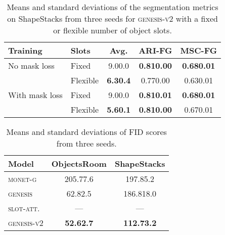 \documentclass{article}
\begin{document}
\begin{table}
	\centering
	\caption{Means and standard deviations of the segmentation metrics on ShapeStacks from three seeds for \textsc{genesis-v2} with a fixed or flexible number of object slots.}
	\begin{tabular}{llccc}
		\toprule
		Training & Slots & Avg.  & ARI-FG & MSC-FG \\
		\midrule
		No mask loss & Fixed    & 9.00.0 & \textbf{0.810.00} & \textbf{0.680.01} \\
                     & Flexible & \textbf{6.30.4} & 0.770.00 & 0.630.01 \\
        \midrule
		With mask loss & Fixed & 9.00.0 & \textbf{0.810.01} & \textbf{0.680.01} \\
		               & Flexible & \textbf{5.60.1} & \textbf{0.810.00} & 0.670.01 \\
		\bottomrule
	\end{tabular}
	\label{tab:gpp:dynamic_k}
\end{table}

\begin{table}
    \centering
	\caption{Means and standard deviations of FID scores from three seeds.}
	\begin{tabular}{lcc}
		\toprule
		Model & ObjectsRoom & ShapeStacks \\
		\midrule
		\textsc{monet-g}   & 205.77.6         & 197.85.2  \\
		\textsc{genesis}   & 62.82.5          & 186.818.0 \\
		\textsc{slot-att.} & --- & --- \\
		\textsc{genesis-v2} & \textbf{52.62.7} & \textbf{112.73.2} \\
		\bottomrule
	\end{tabular}
	\label{tab:gpp:generation}
\end{table}
\end{document}
